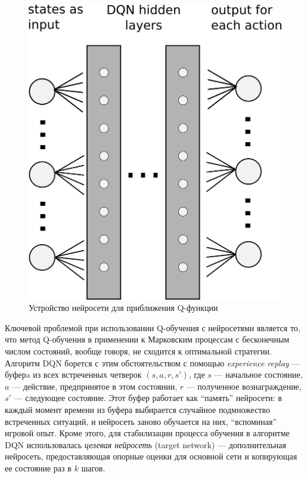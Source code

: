 \documentclass[specification, annotation]{itmo-student-thesis}
\begin{document}
\begin{figure}[!h]
  \caption{Устройство нейросети для приближения Q-функции}\label{dqn-scheme}
  \centering
  \includegraphics{dqn-scheme}
\end{figure}

Ключевой проблемой при использовании Q-обучения с нейросетями является то, что
метод Q-обучения в применении к Марковским процессам с бесконечным числом
состояний, вообще говоря, не сходится к оптимальной стратегии. Алгоритм DQN
борется с этим обстоятельством с помощью \textit{experience replay} --- буферa
из всех встреченных четверок $(s, a, r, s')$, где $s$ ---
начальное состояние, $a$ --- действие, предпринятое в этом состоянии, $r$ ---
полученное вознаграждение, $s'$ --- следующее состояние. Этот буфер работает как
\enquote{память} нейросети: в каждый момент времени из буфера выбирается случайное
подмножество встреченных ситуаций, и нейросеть заново обучается на них,
\enquote{вспоминая} игровой опыт. Кроме этого, для стабилизации процесса обучения в
алгоритме DQN использовалась \textit{целевая нейросеть} (target network) ---
дополнительная нейросеть, предоставляющая опорные оценки для основной сети и
копирующая ее состояние раз в $k$ шагов.
\end{document}
